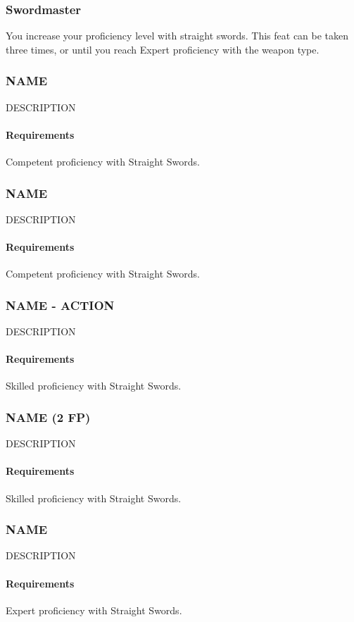 \subsubsection{Swordmaster} \label{feat::swordmaster}
    You increase your proficiency level with straight swords.
    This feat can be taken three times, or until you reach Expert proficiency with the weapon type.
\subsubsection{NAME} \label{feat::name}
    DESCRIPTION
    \paragraph{Requirements} Competent proficiency with Straight Swords.
\subsubsection{NAME} \label{feat::name}
    DESCRIPTION
    \paragraph{Requirements} Competent proficiency with Straight Swords.
\subsubsection{NAME - ACTION} \label{feat::name}
    DESCRIPTION
    \paragraph{Requirements} Skilled proficiency with Straight Swords.
\subsubsection{NAME (2 FP)} \label{feat::name}
    DESCRIPTION
    \paragraph{Requirements} Skilled proficiency with Straight Swords.
\subsubsection{NAME} \label{feat::name}
    DESCRIPTION
    \paragraph{Requirements} Expert proficiency with Straight Swords.
